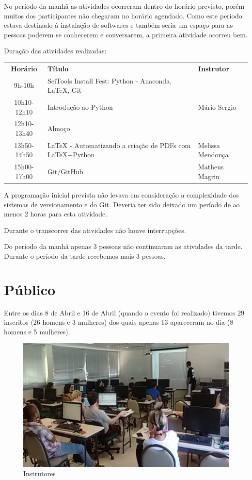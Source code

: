 \documentclass[12pt]{article}
\begin{document}
No período da manhã as atividades ocorreram dentro do horário previsto, porém muitos dos participantes
não chegaram no horário agendado. Como este período estava destinado à instalação de softwares e também
seria um espaço para as pessoas poderem se conhecerem e conversarem, a primeira atividade ocorreu bem.

Duração das atividades realizadas:

\begin{tabular}{cp{}l}
  \textbf{Horário} & \textbf{Título} & \textbf{Instrutor} \\
  9h-10h & SciTools Install Fest: Python - Anaconda, LaTeX, Git & \\
  10h10-12h10 & Introdução ao Python & Mário Sergio \\
  12h10-13h40 & Almoço \\
  13h50-14h50 & LaTeX - Automatizando a criação de PDFs com LaTeX+Python & Melissa Mendonça \\
  15h00-17h00 & Git/GitHub & Matheus Magrin \\
\end{tabular}

A programação inicial prevista não levava em consideração a complexidade dos sistemas de versionamento e
do Git. Deveria ter sido deixado um período de ao menos 2 horas para esta atividade.

Durante o transcorrer das atividades não houve interrupções.

Do período da manhã apenas 3 pessoas não continuaram as atividades da tarde.
Durante o período da tarde recebemos mais 3 pessoas.

\newpage

\section*{Público}

Entre os dias 8 de Abril e 16 de Abril (quando o evento foi realizado)
tivemos 29 inscritos (26 homens e 3 mulheres) dos quais apenas 13 apareceram no
dia (8 homens e 5 mulheres).

\begin{figure}[!htb]
\includegraphics[width=\textwidth]{../../media/photos/pre0-cut}
\caption{Instrutores}
\end{figure}
\end{document}
